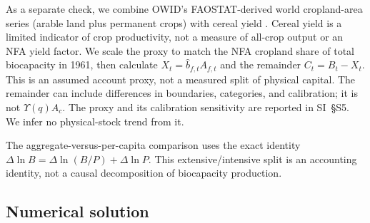 As a separate check, we combine OWID's FAOSTAT-derived world cropland-area series (arable land plus permanent crops) with cereal yield \citep{OWIDCereal2026,OWIDCropland2026}. Cereal yield is a limited indicator of crop productivity, not a measure of all-crop output or an NFA yield factor. We scale the proxy to match the NFA cropland share of total biocapacity in 1961, then calculate $X_t=\hat b_{f,t}A_{f,t}$ and the remainder $C_t=B_t-X_t$. This is an assumed account proxy, not a measured split of physical capital. The remainder can include differences in boundaries, categories, and calibration; it is not $\Upsilon(q)A_c$. The proxy and its calibration sensitivity are reported in SI~\S S5. We infer no physical-stock trend from it.

The aggregate-versus-per-capita comparison uses the exact identity $\Delta\ln B=\Delta\ln(B/P)+\Delta\ln P$. This extensive/intensive split is an accounting identity, not a causal decomposition of biocapacity production.

\subsection{Numerical solution}\label{sec:numerics}

